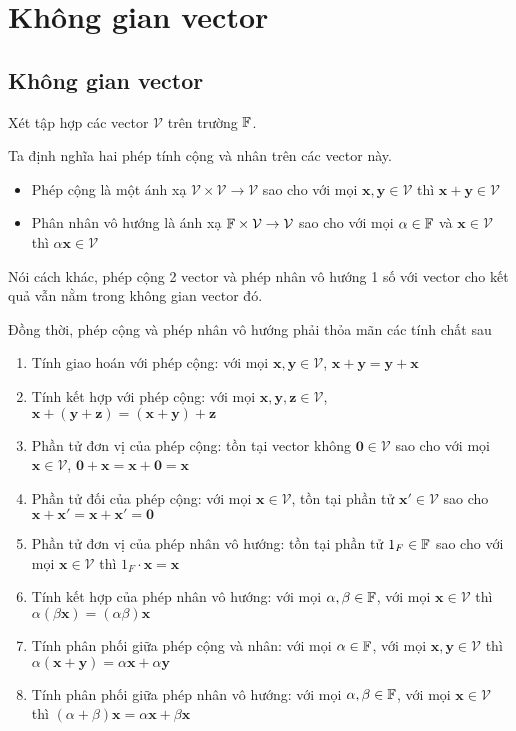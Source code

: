 \section{Không gian vector}

\subsection*{Không gian vector}

Xét tập hợp các vector $\mathcal{V}$ trên trường $\mathbb{F}$.

Ta định nghĩa hai phép tính cộng và nhân trên các vector này.

\begin{itemize}[noitemsep]
    \item Phép cộng là một ánh xạ $\mathcal{V} \times \mathcal{V} \to \mathcal{V}$ sao cho
    với mọi $\bm{x}, \bm{y} \in \mathcal{V}$ thì $\bm{x} + \bm{y} \in \mathcal{V}$
    \item Phân nhân vô hướng là ánh xạ $\mathbb{F} \times \mathcal{V} \to \mathcal{V}$ sao cho
    với mọi $\alpha \in \mathbb{F}$ và $\bm{x} \in \mathcal{V}$ thì $\alpha \bm{x} \in \mathcal{V}$
\end{itemize}

Nói cách khác, phép cộng 2 vector và phép nhân vô hướng 1 số với vector cho kết quả vẫn nằm trong không gian vector đó.

Đồng thời, phép cộng và phép nhân vô hướng phải thỏa mãn các tính chất sau

\begin{enumerate}
    \item Tính giao hoán với phép cộng: với mọi $\bm{x}, \bm{y} \in \mathcal{V}$, $\bm{x} + \bm{y} = \bm{y} + \bm{x}$
    \item Tính kết hợp với phép cộng: với mọi $\bm{x}, \bm{y}, \bm{z} \in \mathcal{V}$, $\bm{x} + (\bm{y} + \bm{z}) = (\bm{x} + \bm{y}) + \bm{z}$
    \item Phần tử đơn vị của phép cộng: tồn tại vector không $\bm{0} \in \mathcal{V}$ sao cho với mọi $\bm{x} \in \mathcal{V}$, $\bm{0} + \bm{x} = \bm{x} + \bm{0} = \bm{x}$
    \item Phần tử đối của phép cộng: với mọi $\bm{x} \in \mathcal{V}$, tồn tại phần tử $\bm{x'} \in \mathcal{V}$ sao cho $\bm{x} + \bm{x'} = \bm{x} + \bm{x'} = \bm{0}$
    \item Phần tử đơn vị của phép nhân vô hướng: tồn tại phần tử $1_F \in \mathbb{F}$ sao cho với mọi $\bm{x} \in \mathcal{V}$ thì $1_F \cdot \bm{x} = \bm{x}$
    \item Tính kết hợp của phép nhân vô hướng: với mọi $\alpha, \beta \in \mathbb{F}$, với mọi $\bm{x} \in \mathcal{V}$ thì $\alpha (\beta \bm{x}) = (\alpha \beta) \bm{x}$
    \item Tính phân phối giữa phép cộng và nhân: với mọi $\alpha \in \mathbb{F}$, với mọi $\bm{x}, \bm{y} \in \mathcal{V}$ thì $\alpha (\bm{x} + \bm{y}) = \alpha \bm{x} + \alpha \bm{y}$
    \item Tính phân phối giữa phép nhân vô hướng: với mọi $\alpha, \beta \in \mathbb{F}$, với mọi $\bm{x} \in \mathcal{V}$ thì $(\alpha + \beta) \bm{x} = \alpha \bm{x} + \beta \bm{x}$
\end{enumerate}

